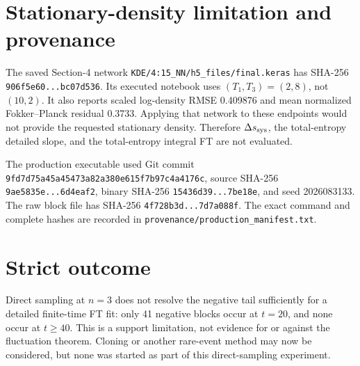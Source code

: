 \documentclass[11pt]{article}
\begin{document}
\section{Stationary-density limitation and provenance}

The saved Section-4 network
\texttt{KDE/4:15\_NN/h5\_files/final.keras} has SHA-256
\texttt{906f5e60...bc07d536}.  Its executed notebook uses
$(T_1,T_3)=(2,8)$, not $(10,2)$.  It also reports scaled log-density RMSE
0.409876 and mean normalized Fokker--Planck residual 0.3733.  Applying that
network to these endpoints would not provide the requested stationary density.
Therefore $\Delta s_{\rm sys}$, the total-entropy detailed slope, and the
total-entropy integral FT are not evaluated.

The production executable used Git commit
\texttt{9fd7d75a45a45473a82a380e615f7b97c4a4176c}, source SHA-256
\texttt{9ae5835e...6d4eaf2}, binary SHA-256
\texttt{15436d39...7be18e}, and seed 2026083133.  The raw block file has
SHA-256 \texttt{4f728b3d...7d7a088f}.  The exact command and complete hashes
are recorded in \texttt{provenance/production\_manifest.txt}.

\section{Strict outcome}

Direct sampling at $n=3$ does not resolve the negative tail sufficiently for a
detailed finite-time FT fit: only 41 negative blocks occur at $t=20$, and none
occur at $t\ge40$.  This is a support limitation, not evidence for or against
the fluctuation theorem.  Cloning or another rare-event method may now be
considered, but none was started as part of this direct-sampling experiment.
\end{document}
